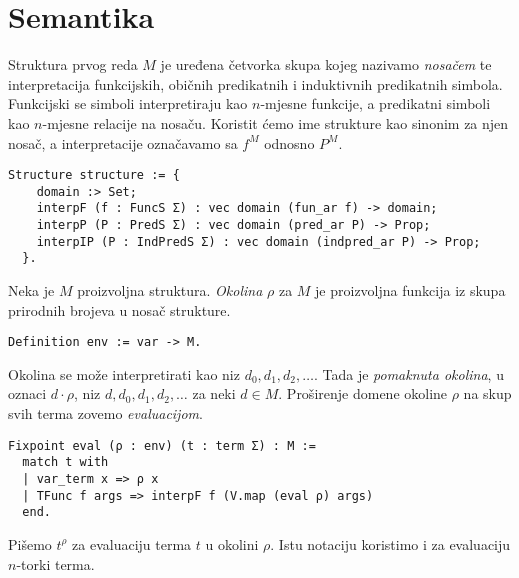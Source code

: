 \section{Semantika}\label{sec:semantika}
\begin{definition}[Struktura]
  Struktura prvog reda \(M\) je uređena četvorka skupa kojeg nazivamo \textit{nosačem}
  te interpretacija funkcijskih, običnih predikatnih i induktivnih predikatnih simbola.
  Funkcijski se simboli interpretiraju kao \(n\)-mjesne funkcije, a predikatni simboli kao \(n\)-mjesne relacije na nosaču.
  Koristit ćemo ime strukture kao sinonim za njen nosač, a interpretacije označavamo sa \(f^{M}\) odnosno \(P^{M}\).
\begin{verbatim}
Structure structure := {
    domain :> Set;
    interpF (f : FuncS Σ) : vec domain (fun_ar f) -> domain;
    interpP (P : PredS Σ) : vec domain (pred_ar P) -> Prop;
    interpIP (P : IndPredS Σ) : vec domain (indpred_ar P) -> Prop;
  }.
\end{verbatim}
\end{definition}

\begin{definition}
  Neka je \(M\) proizvoljna struktura. \textit{Okolina} \(\rho\) za \(M\) je proizvoljna funkcija iz skupa prirodnih brojeva u nosač strukture.
\begin{verbatim}
Definition env := var -> M.
\end{verbatim}
  \noindent Okolina se može interpretirati kao niz \(d_{0}, d_{1}, d_{2}, \ldots\). Tada je \textit{pomaknuta okolina}, u oznaci \(d \cdot \rho\),
  niz \(d, d_{0}, d_{1}, d_{2}, \ldots\) za neki \(d \in M\).
  \noindent Proširenje domene okoline \(\rho\) na skup svih terma zovemo \textit{evaluacijom}.
\begin{verbatim}
Fixpoint eval (ρ : env) (t : term Σ) : M :=
  match t with
  | var_term x => ρ x
  | TFunc f args => interpF f (V.map (eval ρ) args)
  end.
\end{verbatim}
  Pišemo \(t^{\rho}\) za evaluaciju terma \(t\) u okolini \(\rho\).
  Istu notaciju koristimo i za evaluaciju \(n\)-torki terma.
\end{definition}


